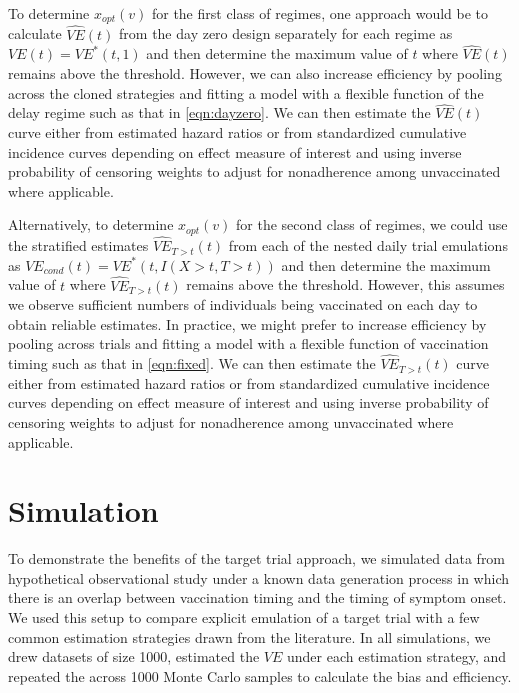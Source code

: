 \begin{appendices}
\begin{refsection}
    To determine $x_{opt}(v)$ for the first class of regimes, one approach would be to calculate $\widehat{VE}(t)$ from the day zero design separately for each regime as $VE(t) = VE^*(t, 1)$ and then determine the maximum value of $t$ where $\widehat{VE}(t)$ remains above the threshold. However, we can also increase efficiency by pooling across the cloned strategies and fitting a model with a flexible function of the delay regime such as that in \ref{eqn:dayzero}. We can then estimate the $\widehat{VE}(t)$ curve either from estimated hazard ratios or from standardized cumulative incidence curves depending on effect measure of interest and using inverse probability of censoring weights to adjust for nonadherence among unvaccinated where applicable.

    Alternatively, to determine $x_{opt}(v)$ for the second class of regimes, we could use the stratified estimates $\widehat{VE}_{T > t}(t)$ from each of the nested daily trial emulations as $VE_{cond}(t) = VE^*(t, I(X > t, T > t))$ and then determine the maximum value of $t$ where  $\widehat{VE}_{T > t}(t)$ remains above the threshold. However, this assumes we observe sufficient numbers of individuals being vaccinated on each day to obtain reliable estimates. In practice, we might prefer to increase efficiency by pooling across trials and fitting a model with a flexible function of vaccination timing such as that in \ref{eqn:fixed}. We can then estimate the $\widehat{VE}_{T > t}(t)$ curve either from estimated hazard ratios or from standardized cumulative incidence curves depending on effect measure of interest and using inverse probability of censoring weights to adjust for nonadherence among unvaccinated where applicable.

    
    

    

    \clearpage 
    \section{Simulation} \label{sec:simulation_appendix}
    To demonstrate the benefits of the target trial approach, we simulated data from hypothetical observational study under a known data generation process in which there is an overlap between vaccination timing and the timing of symptom onset. We used this setup to compare explicit emulation of a target trial with a few common estimation strategies drawn from the literature. In all simulations, we drew datasets of size 1000, estimated the $VE$ under each estimation strategy, and repeated the across 1000 Monte Carlo samples to calculate the bias and efficiency.


\end{refsection}
\end{appendices}
